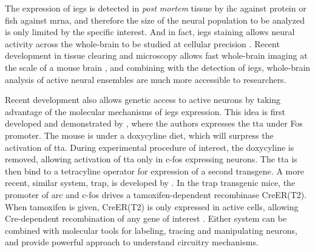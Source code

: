 The expression of \glspl{ieg} is detected in \textit{post mortem} tissue by \gls{ihc} against protein or \gls{fish} against \gls{mrna}, and therefore the size of the neural population to be analyzed is only limited by the specific interest. And in fact, \glspl{ieg} staining allows neural activity across the whole-brain to be studied at cellular precision \citep{wheeler13}. Recent development in tissue clearing and microscopy allows fast whole-brain imaging at the scale of a mouse brain , and combining with the detection of \glspl{ieg}, whole-brain analysis of active neural ensembles are much more accessible to researchers.   

Recent development also allows genetic access to active neurons by taking advantage of the molecular mechanisms of \glspl{ieg} expression. This idea is first developed and demonstrated by \citet{reijmers07}, where the authors expresses the \gls{tta} under Fos promoter. The mouse is under a doxycyline diet, which will surpress the activation of \gls{tta}. During experimental procedure of interest, the doxycyline is removed, allowing activation of \gls{tta} only in c-fos expressing neurons. The \gls{tta} is then bind to a tetracyline operator for expression of a second transgene. A more recent, similar system, \gls{trap}, is developed by \citet{guenthner13}. In the \gls{trap} transgenic mice, the promoter of \gls{arc} and c-fos drives a tamoxifen-dependent recombinase CreER(T2). When tamoxifen is given, CreER(T2) is only expressed in active cells, allowing Cre-dependent recombination of any gene of interest \citep{guenthner13}. Either system can be combined with molecular tools for labeling, tracing and manipulating neurons, and provide powerful approach to understand circuitry mechanisms.

